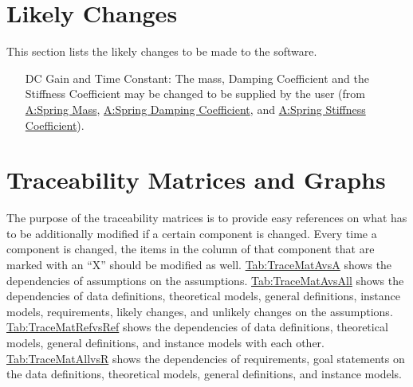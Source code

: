 \documentclass[12pt]{article}
\begin{document}
\section{Likely Changes}
\label{Sec:LCs}
This section lists the likely changes to be made to the software.

\begin{itemize}
\item[DC Gain and Time Constant:\phantomsection\label{likeChgPP}]{The mass, Damping Coefficient and the Stiffness Coefficient may be changed to be supplied by the user (from \hyperref[massSpring]{A:Spring Mass}, \hyperref[dampingCoeffSpring]{A:Spring Damping Coefficient}, and \hyperref[stiffnessCoeffSpring]{A:Spring Stiffness Coefficient}).}
\end{itemize}
\section{Traceability Matrices and Graphs}
\label{Sec:TraceMatrices}
The purpose of the traceability matrices is to provide easy references on what has to be additionally modified if a certain component is changed. Every time a component is changed, the items in the column of that component that are marked with an ``X'' should be modified as well. \hyperref[Table:TraceMatAvsA]{Tab:TraceMatAvsA} shows the dependencies of assumptions on the assumptions. \hyperref[Table:TraceMatAvsAll]{Tab:TraceMatAvsAll} shows the dependencies of data definitions, theoretical models, general definitions, instance models, requirements, likely changes, and unlikely changes on the assumptions. \hyperref[Table:TraceMatRefvsRef]{Tab:TraceMatRefvsRef} shows the dependencies of data definitions, theoretical models, general definitions, and instance models with each other. \hyperref[Table:TraceMatAllvsR]{Tab:TraceMatAllvsR} shows the dependencies of requirements, goal statements on the data definitions, theoretical models, general definitions, and instance models.
\end{document}
